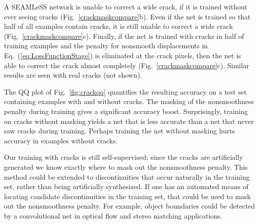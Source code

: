 \documentclass{article}
\begin{document}
A SEAMLeSS network is unable to correct a wide crack, if it is trained without ever seeing cracks (Fig.~\ref{crackmaskcompare}b).  Even if the net is trained so that half of all examples contain cracks, it is still unable to correct a wide crack (Fig.~\ref{crackmaskcompare}c). Finally, if the net is trained with cracks in half of training examples and the penalty for nonsmooth displacements in Eq.~(\ref{eq:LossFunctionStage}) is eliminated at the crack pixels, then the net is able to correct the crack almost completely (Fig.~\ref{crackmaskcompare}c). Similar results are seen with real cracks (not shown). 

The QQ plot of Fig.~\ref{fig:crackqq} quantifies the resulting accuracy on a test set containing examples with and without cracks.
The masking of the nonsmoothness penalty during training gives a significant accuracy boost. Surprisingly, training on cracks without masking yields a net that is less accurate than a net that never saw cracks during training. Perhaps training the net without masking hurts accuracy in examples without cracks.

Our training with cracks is still self-supervised; since the cracks are artificially generated we know exactly where to mask out the nonsmoothness penalty. This method could be extended to discontinuities that occur naturally in the training set, rather than being artificially synthesized. If one has an automated means of locating candidate discontinuities in the training set, that could be used to mask out the nonsmoothness penalty. For example, object boundaries could be detected by a convolutional net in optical flow and stereo matching applications.
\end{document}
